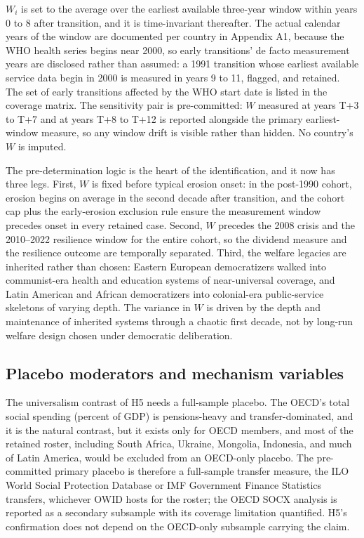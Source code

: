 $W_i$ is set to the average over the earliest available three-year window within years 0 to 8 after transition, and it is time-invariant thereafter. The actual calendar years of the window are documented per country in Appendix A1, because the WHO health series begins near 2000, so early transitions' de facto measurement years are disclosed rather than assumed: a 1991 transition whose earliest available service data begin in 2000 is measured in years 9 to 11, flagged, and retained. The set of early transitions affected by the WHO start date is listed in the coverage matrix. The sensitivity pair is pre-committed: $W$ measured at years T+3 to T+7 and at years T+8 to T+12 is reported alongside the primary earliest-window measure, so any window drift is visible rather than hidden. No country's $W$ is imputed.

The pre-determination logic is the heart of the identification, and it now has three legs. First, $W$ is fixed before typical erosion onset: in the post-1990 cohort, erosion begins on average in the second decade after transition, and the cohort cap plus the early-erosion exclusion rule ensure the measurement window precedes onset in every retained case. Second, $W$ precedes the 2008 crisis and the 2010--2022 resilience window for the entire cohort, so the dividend measure and the resilience outcome are temporally separated. Third, the welfare legacies are inherited rather than chosen: Eastern European democratizers walked into communist-era health and education systems of near-universal coverage, and Latin American and African democratizers into colonial-era public-service skeletons of varying depth. The variance in $W$ is driven by the depth and maintenance of inherited systems through a chaotic first decade, not by long-run welfare design chosen under democratic deliberation.

\subsection{Placebo moderators and mechanism variables}

The universalism contrast of H5 needs a full-sample placebo. The OECD's total social spending (percent of GDP) is pensions-heavy and transfer-dominated, and it is the natural contrast, but it exists only for OECD members, and most of the retained roster, including South Africa, Ukraine, Mongolia, Indonesia, and much of Latin America, would be excluded from an OECD-only placebo. The pre-committed primary placebo is therefore a full-sample transfer measure, the ILO World Social Protection Database or IMF Government Finance Statistics transfers, whichever OWID hosts for the roster; the OECD SOCX analysis is reported as a secondary subsample with its coverage limitation quantified. H5's confirmation does not depend on the OECD-only subsample carrying the claim.

